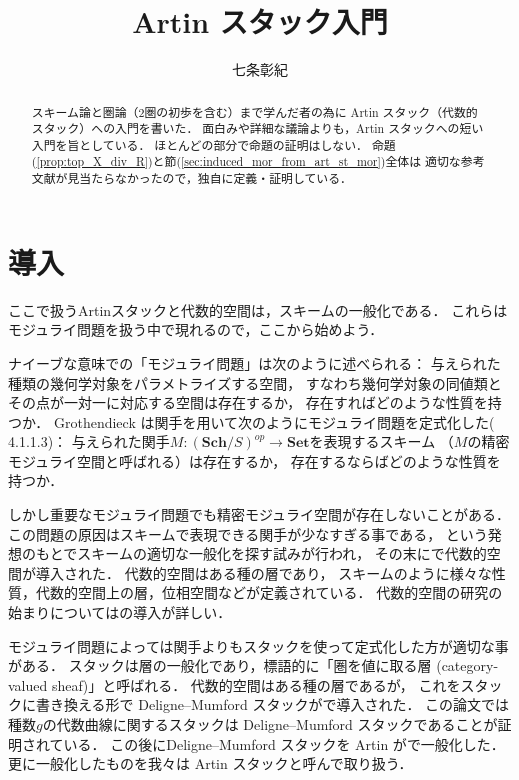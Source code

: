 



    \title{Artin スタック入門}
    \author{七条彰紀}
    \maketitle

    \begin{abstract}
        スキーム論と圏論（$2$圏の初歩を含む）まで学んだ者の為に
        Artin スタック（代数的スタック）への入門を書いた．
        面白みや詳細な議論よりも，Artin スタックへの短い入門を旨としている．
        ほとんどの部分で命題の証明はしない．
        命題 (\ref{prop:top_X_div_R})と節(\ref{sec:induced_mor_from_art_st_mor})全体は
        適切な参考文献が見当たらなかったので，独自に定義・証明している．
    \end{abstract}

    \setcounter{tocdepth}{2}
    \tableofcontents
    \newpage

\section{導入}
    ここで扱うArtinスタックと代数的空間は，スキームの一般化である．
    これらはモジュライ問題を扱う中で現れるので，ここから始めよう．

    ナイーブな意味での「モジュライ問題」は次のように述べられる：
    与えられた種類の幾何学対象をパラメトライズする空間，
    すなわち幾何学対象の同値類とその点が一対一に対応する空間は存在するか，
    存在すればどのような性質を持つか．
    Grothendieck は関手を用いて次のようにモジュライ問題を定式化した(\cite{Kromer07} 4.1.1.3)：
    与えられた関手$M \colon (\mathbf{Sch}/S)^{op} \to \mathbf{Set}$を表現するスキーム
    （$M$の精密モジュライ空間と呼ばれる）は存在するか，
    存在するならばどのような性質を持つか．

    しかし重要なモジュライ問題でも精密モジュライ空間が存在しないことがある．
    この問題の原因はスキームで表現できる関手が少なすぎる事である，
    という発想のもとでスキームの適切な一般化を探す試みが行われ，
    その末に\cite{Artin69}で代数的空間が導入された．
    代数的空間はある種の層であり，
    スキームのように様々な性質，代数的空間上の層，位相空間などが定義されている．
    代数的空間の研究の始まりについては\cite{Knutson71}の導入が詳しい．

    モジュライ問題によっては関手よりもスタックを使って定式化した方が適切な事がある．
    スタックは層の一般化であり，標語的に「圏を値に取る層 (category-valued sheaf)」と呼ばれる．
    代数的空間はある種の層であるが，
    これをスタックに書き換える形で Deligne--Mumford スタックが\cite{DM69}で導入された．
    この論文では種数$g$の代数曲線に関するスタックは
    Deligne--Mumford スタックであることが証明されている．
    この後にDeligne--Mumford スタックを Artin が\cite{Artin74}で一般化した．
    更に一般化したものを我々は Artin スタックと呼んで取り扱う．

